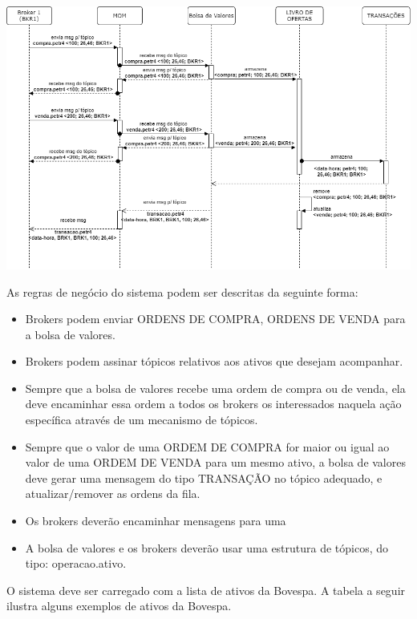 \documentclass[12pt,brazil, a4paper, fullpage]{article}
\begin{document}
\begin{center}
    \includegraphics[width=.93\textwidth]{bolsadevalores.png} \\
\end{center}

As regras de negócio do sistema podem ser descritas da seguinte forma:

\begin{itemize}
    \item Brokers podem enviar ORDENS DE COMPRA, ORDENS DE VENDA para a bolsa de valores.
    \item Brokers podem assinar tópicos relativos aos ativos que desejam acompanhar.
    \item Sempre que a bolsa de valores recebe uma ordem de compra ou de venda, ela deve encaminhar essa ordem a todos os brokers os interessados naquela ação específica através de um mecanismo de tópicos.
    \item Sempre que o valor de uma ORDEM DE COMPRA for maior ou igual ao valor de uma ORDEM DE VENDA para um mesmo ativo, a bolsa de valores deve gerar uma mensagem do tipo TRANSAÇÃO no tópico adequado, e atualizar/remover as ordens da fila.
    \item Os brokers deverão encaminhar mensagens para uma
    \item A bolsa de valores e os brokers deverão usar uma estrutura de tópicos, do tipo: operacao.ativo.
\end{itemize}

O sistema deve ser carregado com a lista de ativos da Bovespa. A tabela a seguir ilustra alguns exemplos de ativos da Bovespa.
\end{document}
